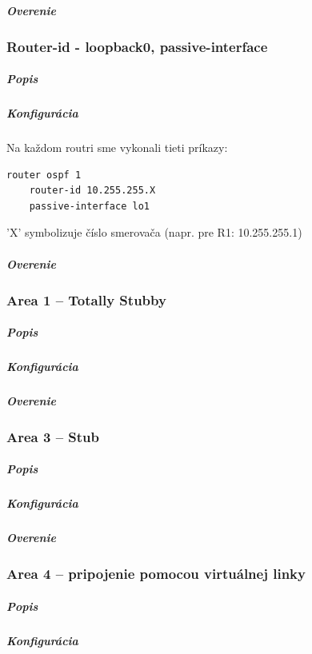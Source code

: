 \documentclass[12pt,twoside,a4paper]{article}
\begin{document}
\subparagraph{Overenie}
\subparagraph{}



\subsubsection*{Router-id - loopback0, passive-interface}
\subparagraph{Popis}
\subparagraph{}

\subparagraph{Konfigurácia}
Na každom routri sme vykonali tieti príkazy:
\noindent
{\selectfont

\begin{small}

\begin{verbatim}
router ospf 1
    router-id 10.255.255.X
    passive-interface lo1
\end{verbatim}

\end{small}

}


'X' symbolizuje číslo smerovača (napr. pre R1: 10.255.255.1)

\subparagraph{Overenie}
\subparagraph{}



\subsubsection*{Area 1 – Totally Stubby}
\subparagraph{Popis}
\subparagraph{}

\subparagraph{Konfigurácia}

\subparagraph{Overenie}
\subparagraph{}



\subsubsection*{Area 3 – Stub}
\subparagraph{Popis}
\subparagraph{}

\subparagraph{Konfigurácia}

\subparagraph{Overenie}
\subparagraph{}



\subsubsection*{Area 4 – pripojenie pomocou virtuálnej linky}
\subparagraph{Popis}
\subparagraph{}

\subparagraph{Konfigurácia}
\end{document}
